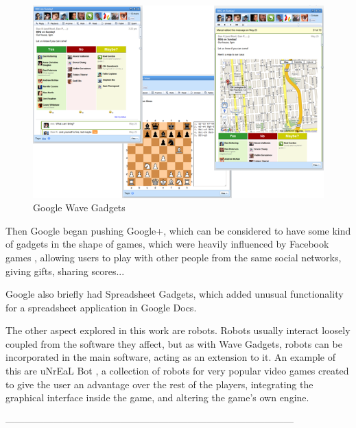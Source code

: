 \begin{figure}[h]
  \center
    \includegraphics[keepaspectratio, scale=0.5]{Media/Captures/Soa/WaveGadgets.png}
  \caption{Google Wave Gadgets}
  \label{fig:wave_gadgets}
\end{figure}

Then Google began pushing Google+, which can be considered to have some kind of gadgets in the shape of games, which were heavily influenced by Facebook games \cite{ref:facebook_games}, allowing users to play with other people from the same social networks, giving gifts, sharing scores...

Google also briefly had Spreadsheet Gadgets, which added unusual functionality for a spreadsheet application in Google Docs.

The other aspect explored in this work are robots. Robots usually interact loosely coupled from the software they affect, but as with Wave Gadgets, robots can be incorporated in the main software, acting as an extension to it. An example of this are uNrEaL Bot \cite{ref:unreal_bot}, a collection of robots for very popular video games created to give the user an advantage over the rest of the players, integrating the graphical interface inside the game, and altering the game's own engine.


\begin{center}
------------------------------------------------------------------------------------------\\
\end{center}


